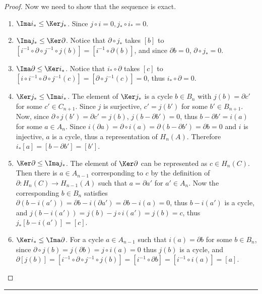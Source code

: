 \begin{proof}
Now we need to show that the sequence is exact.
\begin{enumerate}
\item $\Ima i_*\leq \Ker j_*$. Since $j\circ i=0, j_*\circ i_*=0$.
\item $\Ima j_*\leq \Ker \partial$. Notice that $\partial\circ j_*$ takes $[b]$ to $[i^{-1}\circ \partial\circ j^{-1}\circ j(b)]=[i^{-1}\circ \partial (b)]$, and since $\partial b=0$, $\partial \circ j_*=0$.
\item $\Ima \partial \leq \Ker i_*$. Notice that $i_*\circ \partial$ takes $[c]$ to $[i\circ i^{-1}\circ \partial\circ j^{-1}(c)]=[\partial\circ j^{-1}(c)]=0$, thus $i_*\circ \partial=0$.
\item $\Ker j_*\leq \Ima i_*$. The element of $\Ker j_*$ is a cycle $b\in B_n$ with $j(b)=\partial c'$ for some $c'\in C_{n+1}$. Since $j$ is surjective, $c'=j(b')$ for some $b'\in B_{n+1}$. Now, since $\partial\circ j(b')=\partial c'=j(b)$, $j(b-\partial b')=0$, thus $b-\partial b'=i(a)$ for some $a\in A_n$. Since $i(\partial a)=\partial\circ i(a)=\partial (b-\partial b')=\partial b=0$ and $i$ is injective, $a$ is a cycle, thus a representation of $H_n(A)$. Therefore $i_*[a]=[b-\partial b']=[b']$.
\item $\Ker \partial \leq \Ima j_*$. The element of $\Ker \partial$ can be represented as $c\in H_n(C)$. Then there is $a\in A_{n-1}$ corresponding to $c$ by the definition of $\partial:H_n(C)\rightarrow H_{n-1}(A)$ such that $a=\partial a'$ for $a'\in A_n$. Now the corresponding $b\in B_n$ satisfies $\partial(b-i(a'))=\partial b-i(\partial a')=\partial b-i(a)=0$, thus $b-i(a')$ is a cycle, and $j(b-i(a'))=j(b)-j\circ i(a')=j(b)=c$, thus $j_*[b-i(a')]=[c]$.
\item $\Ker i_*\leq \Ima \partial$. For a cycle $a\in A_{n-1}$ such that $i(a)=\partial b$ for some $b\in B_n$, since $\partial\circ j(b)=j(\partial b)=j\circ i(a)=0$ thus $j(b)$ is a cycle, and $\partial[j(b)]=[i^{-1}\circ \partial\circ j^{-1}\circ j(b)]=[i^{-1}\circ \partial b]=[i^{-1}\circ i(a)]=[a]$.
\end{enumerate}
\end{proof}

\noindent\rule{\textwidth}{1pt}
\newline
